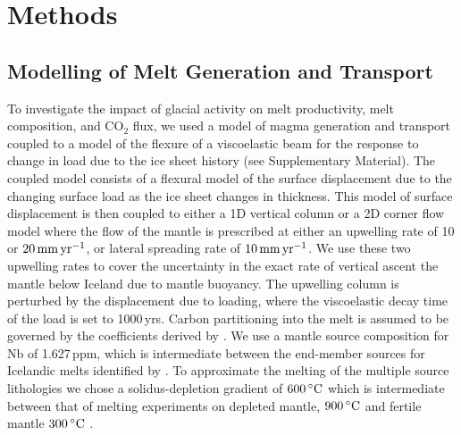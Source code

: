\documentclass[draft,linenumbers]{agujournal2018}
\begin{document}
\section{Methods}
\subsection{Modelling of Melt Generation and Transport}

To investigate the impact of glacial activity on melt productivity, melt composition, and CO$_{2}$ flux, we used a model of magma generation and transport coupled to a model of the flexure of a viscoelastic beam for the response to change in load due to the ice sheet history (see Supplementary Material). The coupled model consists of a flexural model of the surface displacement due to the changing surface load as the ice sheet changes in thickness. This model of surface displacement is then coupled to either a 1D vertical column or a 2D corner flow model where the flow of the mantle is prescribed at either an upwelling rate of 10 or $20\rm\,mm\,yr^{-1}$, or lateral spreading rate of $10\rm\,mm\,yr^{-1}$. We use these two upwelling rates to cover the uncertainty in the exact rate of vertical ascent the mantle below Iceland due to mantle buoyancy. The upwelling column is perturbed by the displacement due to loading, where the viscoelastic decay time of the load is set to 1000\,yrs. Carbon partitioning into the melt is assumed to be governed by the coefficients derived by \citep{rosenthal-etal-2015}. We use a mantle source composition for Nb of 1.627\,ppm, which is intermediate between the end-member sources for Icelandic melts identified by \citep{shorttle-2011}. To approximate the melting of the multiple source lithologies we chose a solidus-depletion gradient of $600\rm\,^{\circ}C$ which is intermediate between that of melting experiments on depleted mantle, $900\rm\,^{\circ}C$ \citep{wasylenki-etal-2003} and fertile mantle $300\rm\,^{\circ}C$ \citep{scott-1992}.
\end{document}
